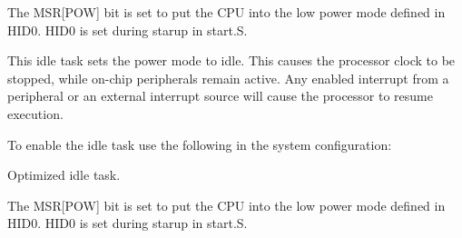 The M\+SR\mbox{[}P\+OW\mbox{]} bit is set to put the C\+PU into the low power mode defined in H\+I\+D0. H\+I\+D0 is set during starup in start.\+S.

This idle task sets the power mode to idle. This causes the processor clock to be stopped, while on-\/chip peripherals remain active. Any enabled interrupt from a peripheral or an external interrupt source will cause the processor to resume execution.

To enable the idle task use the following in the system configuration\+:


\begin{DoxyCode}{0}
\DoxyCodeLine{\textcolor{preprocessor}{\#include <bsp.h>}}
\DoxyCodeLine{}
\DoxyCodeLine{\textcolor{preprocessor}{\#define CONFIGURE\_INIT}}
\DoxyCodeLine{}
\DoxyCodeLine{\textcolor{preprocessor}{\#define CONFIGURE\_IDLE\_TASK\_BODY bsp\_idle\_thread}}
\DoxyCodeLine{}
\end{DoxyCode}


Optimized idle task.

The M\+SR\mbox{[}P\+OW\mbox{]} bit is set to put the C\+PU into the low power mode defined in H\+I\+D0. H\+I\+D0 is set during starup in start.\+S. 